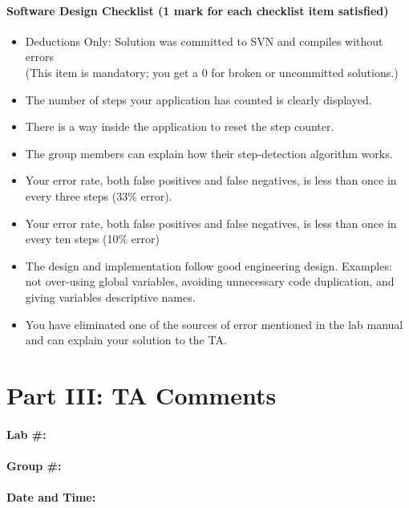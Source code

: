\documentclass[10pt]{article}
\begin{document}
\paragraph{Software Design Checklist (1 mark for each checklist item satisfied)}
\begin{itemize}
\renewcommand{\labelitemi}{$\Box$}
\item Deductions Only: Solution was committed to SVN and compiles without errors \\
(This item is mandatory; you get a 0 for broken or uncommitted solutions.)
\item The number of steps your application has counted is clearly displayed.
\item There is a way inside the application to reset the step counter.
\item The group members can explain how their step-detection algorithm works.
\renewcommand{\labelitemi}{$\Box\Box$}
\item Your error rate, both false positives and false negatives, is less than once in every three steps
(33\% error).
\item Your error rate, both false positives and false negatives, is less than once in every ten steps
(10\% error)
\item The design and implementation follow good engineering design. Examples: not over-using global variables, avoiding unnecessary code duplication, and giving variables descriptive names.
\renewcommand{\labelitemi}{$\Box$}
\item You have eliminated one of the sources of error mentioned in the lab manual and can explain your solution to the TA.
\end{itemize}

\newpage
\section*{Part III: TA Comments}

\paragraph{Lab \#:}
\paragraph{Group \#:}
\paragraph{Date and Time:}
\end{document}
